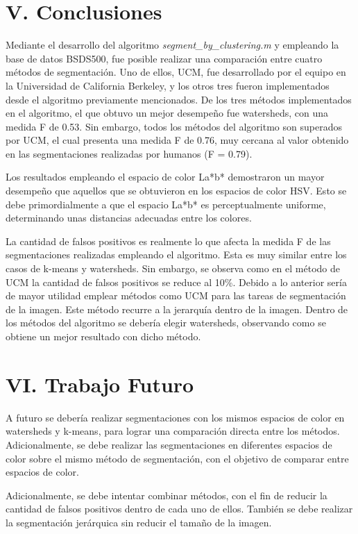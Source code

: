 \documentclass[10pt,twocolumn,letterpaper]{article}
\begin{document}
\section{\textbf{V. Conclusiones}}
Mediante el desarrollo del algoritmo \textit{segment\_by\_clustering.m} y empleando la base de datos BSDS500, fue posible realizar una comparación entre cuatro métodos de segmentación. Uno de ellos, UCM, fue desarrollado por el equipo en la Universidad de California Berkeley, y los otros tres fueron implementados desde el algoritmo previamente mencionados. De los tres métodos implementados en el algoritmo, el que obtuvo un mejor desempeño fue watersheds, con una medida F de 0.53. Sin embargo, todos los métodos del algoritmo son superados por UCM, el cual presenta una medida F de 0.76, muy cercana al valor obtenido en las segmentaciones realizadas por humanos (F = 0.79). 

Los resultados empleando el espacio de color La*b* demostraron un mayor desempeño que aquellos que se obtuvieron en los espacios de color HSV. Esto se debe primordialmente a que el espacio La*b* es perceptualmente uniforme, determinando unas distancias adecuadas entre los colores. 

La cantidad de falsos positivos es realmente lo que afecta la medida F de las segmentaciones realizadas empleando el algoritmo. Esta es muy similar entre los casos de k-means y watersheds. Sin embargo, se observa como en el método de UCM la cantidad de falsos positivos se reduce al 10\%. Debido a lo anterior sería de mayor utilidad emplear métodos como UCM para las tareas de segmentación de la imagen. Este método recurre a la jerarquía dentro de la imagen. Dentro de los métodos del algoritmo se debería elegir watersheds, observando como se obtiene un mejor resultado con dicho método. 

\section{\textbf{VI. Trabajo Futuro}}
A futuro se debería realizar segmentaciones con los mismos espacios de color en watersheds y k-means, para lograr una comparación directa entre los métodos. Adicionalmente, se debe realizar las segmentaciones en diferentes espacios de color sobre el mismo método de segmentación, con el objetivo de comparar entre espacios de color. 

Adicionalmente, se debe intentar combinar métodos, con el fin de reducir la cantidad de falsos positivos dentro de cada uno de ellos. También se debe realizar la segmentación jerárquica sin reducir el tamaño de la imagen. 
\end{document}
